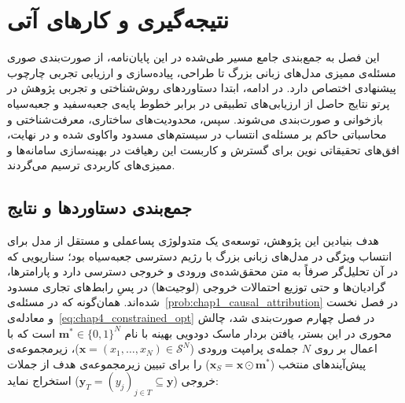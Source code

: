 
\chapter{نتیجه‌گیری و کارهای آتی}\label{chap:chapter6_conclusions}

این فصل به جمع‌بندی جامع مسیر طی‌شده در این پایان‌نامه، از صورت‌بندی صوری مسئله‌ی ممیزی مدل‌های زبانی بزرگ تا طراحی، پیاده‌سازی و ارزیابی تجربی چارچوب پیشنهادی اختصاص دارد. در ادامه، ابتدا دستاوردهای روش‌شناختی و تجربی پژوهش در پرتو نتایج حاصل از ارزیابی‌های تطبیقی در برابر خطوط پایه‌ی جعبه‌سفید و جعبه‌سیاه بازخوانی و صورت‌بندی می‌شوند. سپس، محدودیت‌های ساختاری، معرفت‌شناختی و محاسباتی حاکم بر مسئله‌ی انتساب در سیستم‌های مسدود واکاوی شده و در نهایت، افق‌های تحقیقاتی نوین برای گسترش و کاربست این رهیافت در بهینه‌سازی سامانه‌ها و ممیزی‌های کاربردی ترسیم می‌گردند.


\section{جمع‌بندی دستاوردها و نتایج}\label{sec:6-1}

هدف بنیادین این پژوهش، توسعه‌ی یک متدولوژی پساعملی و مستقل از مدل برای انتساب ویژگی در مدل‌های زبانی بزرگ با رژیم دسترسی جعبه‌سیاه بود؛ سناریویی که در آن تحلیل‌گر صرفاً به متن محقق‌شده‌ی ورودی و خروجی دسترسی دارد و پارامترها، گرادیان‌ها و حتی توزیع احتمالات خروجی (لوجیت‌ها) در پسِ رابط‌های تجاری مسدود شده‌اند. همان‌گونه که در مسئله‌ی~\ref{prob:chap1_causal_attribution} در فصل نخست و معادله‌ی~\ref{eq:chap4_constrained_opt} در فصل چهارم صورت‌بندی شد، چالش محوری در این بستر، یافتن بردار ماسک دودویی بهینه با نام $\mathbf{m}^* \in {\{0, 1\}}^N$ است که با اعمال بر روی $N$ جمله‌ی پرامپت ورودی ($\mathbf{x} = (x_1, \dots, x_N) \in \mathcal{S}^N$)، زیرمجموعه‌ی پیش‌آیندهای منتخب ($\mathbf{x}_S = \mathbf{x} \odot \mathbf{m}^*$) را برای تبیین زیرمجموعه‌ی هدف از جملات خروجی ($\mathbf{y}_T = {(y_j)}_{j \in T} \subseteq \mathbf{y}$) استخراج نماید:

